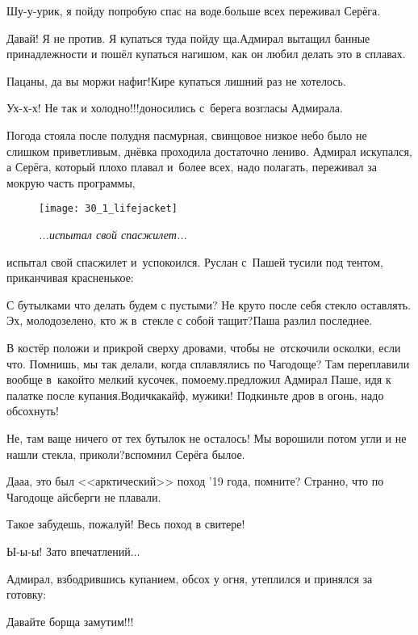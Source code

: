 \diagdash Шу-у-урик, я пойду попробую спас на воде.\mdash больше всех переживал Серёга. 

\diagdash Давай! Я не против. Я купаться туда пойду ща.\mdash Адмирал вытащил банные принадлежности и пошёл купаться нагишом, как он любил делать это в сплавах.

\diagdash Пацаны, да вы моржи нафиг!\mdash Кире купаться лишний раз не хотелось. 

\diagdash Ух-х-х! Не так и холодно!!!\mdash доносились с~берега возгласы Адмирала.

Погода стояла после полудня пасмурная, свинцовое низкое небо было не слишком приветливым, днёвка проходила достаточно лениво. Адмирал искупался, а Серёга, который плохо плавал и~более всех, надо полагать, переживал за мокрую часть программы, \begin{wrapfigure}[10]{r}{0.55\textwidth}
	\centering
	\texttt{[image: 30\_1\_lifejacket]}
	\caption{\small\textit{...испытал свой спасжилет...}}
\end{wrapfigure}испытал свой спасжилет и~успокоился. Руслан с~Пашей тусили под тентом, приканчивая красненькое:


\diagdash С бутылками что делать будем с пустыми? Не круто после себя стекло оставлять. Эх, молодо\sdash зелено, кто ж в~стекле с собой тащит?\mdash Паша разлил последнее.

\diagdash В костёр положи и прикрой сверху дровами, чтобы не~отскочили осколки, если что. Помнишь, мы так делали, когда сплавлялись по Чагодоще? Там переплавили вообще в~какой\sdash то мелкий кусочек, по\sdash моему.\mdash предложил Адмирал Паше, идя к палатке после купания.\mdash Водичка\mdash кайф, мужики! Подкиньте дров в огонь, надо обсохнуть!

\diagdash Не, там ваще ничего от тех бутылок не осталось! Мы ворошили потом угли и не нашли стекла, приколи?\mdash вспомнил Серёга былое.

\diagdash Да\sdash а\sdash а, это был <<арктический>> поход '19 года, помните? Странно, что по Чагодоще айсберги не плавали.

\diagdash Такое забудешь, пожалуй! Весь поход в свитере!

\diagdash Ы-ы-ы! Зато впечатлений$\ldots$

Адмирал, взбодрившись купанием, обсох у огня, утеплился и принялся за готовку:

\diagdash Давайте борща замутим!!!

